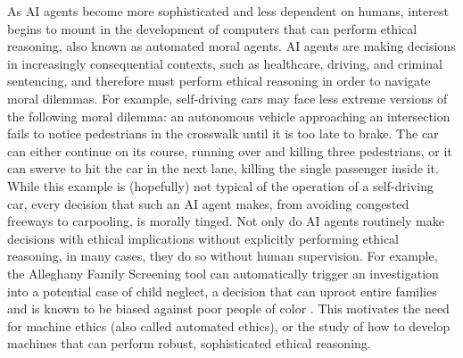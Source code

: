 %
\begin{isabellebody}%
%
%
\isadelimtheory
%
\endisadelimtheory
%
\isatagtheory
%
\endisatagtheory
{\isafoldtheory}%
%
\isadelimtheory
%
\endisadelimtheory
%
\isadelimdocument
%
\endisadelimdocument
%
\isatagdocument
%
\isamarkuptrue%
%
\endisatagdocument
{\isafolddocument}%
%
\isadelimdocument
%
\endisadelimdocument
%
\begin{isamarkuptext}%
As AI agents become more sophisticated and less dependent on humans, interest begins to mount
in the development of computers that can perform ethical reasoning, also known as automated moral agents. 
AI agents are making decisions in increasingly 
consequential contexts, such as healthcare, driving, and criminal sentencing, and therefore 
must perform ethical reasoning in order to navigate moral dilemmas. For example, self-driving
cars may face less extreme versions of the following moral dilemma: an autonomous vehicle approaching 
an intersection fails to notice pedestrians in the crosswalk until it is too late to brake. The car 
can either continue on its course, running over and killing three pedestrians, or it can swerve to 
hit the car in the next lane, killing the single passenger inside it. While this example is (hopefully) 
not typical of the operation of a self-driving car, every decision that such an AI agent makes, from 
avoiding congested freeways to carpooling, is morally tinged. Not only do AI agents routinely make decisions with 
ethical implications without explicitly performing ethical
reasoning, in many cases, they do so without human supervision. For example, the Alleghany Family Screening 
tool can automatically trigger an investigation into a potential case of child neglect, a decision that 
can uproot entire families and is known to be biased against poor people of color \citep{eubanks}. 
This motivates the need for machine ethics (also called automated ethics), 
or the study of how to develop machines that can perform robust, sophisticated ethical reasoning. 


\end{isamarkuptext}
\end{isabellebody}
